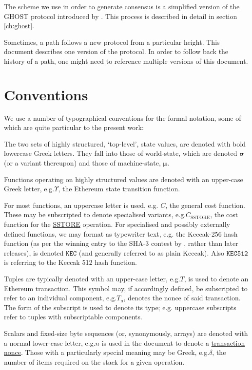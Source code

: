 \documentclass[9pt,oneside]{amsart}
\makeatletter
\newcommand*\eg{e.g.\@\xspace}
\makeatother
\begin{document}
\begin{multicols}{2}
The scheme we use in order to generate consensus is a simplified version of the GHOST protocol introduced by \cite{cryptoeprint:2013:881}. This process is described in detail in section \ref{ch:ghost}.

Sometimes, a path follows a new protocol from a particular height.  This document describes one version of the protocol.  In order to follow back the history of a path, one might need to reference multiple versions of this document.

\section{Conventions}\label{ch:conventions}

We use a number of typographical conventions for the formal notation, some of which are quite particular to the present work:

The two sets of highly structured, `top-level', state values, are denoted with bold lowercase Greek letters. They fall into those of world-state, which are denoted $\boldsymbol{\sigma}$ (or a variant thereupon) and those of machine-state, $\boldsymbol{\mu}$.

Functions operating on highly structured values are denoted with an upper-case Greek letter, \eg \hyperlink{Upsilon_state_transition}{$\Upsilon$}, the Ethereum state transition function.

For most functions, an uppercase letter is used, e.g. $C$, the general cost function. These may be subscripted to denote specialised variants, \eg \hyperlink{C__SSTORE}{$C_\text{SSTORE}$}, the cost function for the \hyperlink{SSTORE}{{\tiny SSTORE}} operation. For specialised and possibly externally defined functions, we may format as typewriter text, \eg the Keccak-256 hash function (as per the winning entry to the SHA-3 contest by \cite{Keccak}, rather than later releases), is denoted $\texttt{KEC}$ (and generally referred to as plain Keccak). Also $\texttt{KEC512}$ is referring to the Keccak 512 hash function.

Tuples are typically denoted with an upper-case letter, \eg $T$, is used to denote an Ethereum transaction. This symbol may, if accordingly defined, be subscripted to refer to an individual component, \eg \hyperlink{transaction_nonce}{$T_{\mathrm{n}}$}, denotes the nonce of said transaction. The form of the subscript is used to denote its type; \eg uppercase subscripts refer to tuples with subscriptable components.

Scalars and fixed-size byte sequences (or, synonymously, arrays) are denoted with a normal lower-case letter, \eg $n$ is used in the document to denote a \hyperlink{transaction_nonce}{transaction nonce}. Those with a particularly special meaning may be Greek, \eg $\delta$, the number of items required on the stack for a given operation.


\end{multicols}
\end{document}

